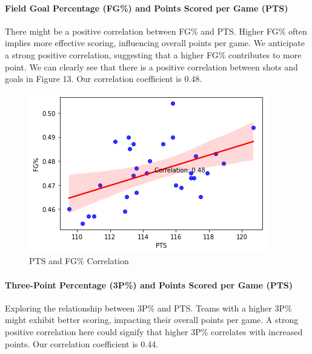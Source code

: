 \documentclass[conference]{IEEEtran}
\begin{document}
\paragraph {Field Goal Percentage (FG\%) and Points Scored per Game (PTS)
}
There might be a positive correlation between FG\% and PTS. Higher FG\% often implies more effective scoring, influencing overall points per game. We anticipate a strong positive correlation, suggesting that a higher FG\% contributes to more point. We can clearly see
that there is a positive correlation between shots and goals in
Figure 13. Our correlation coefficient is 0.48.
\vspace{\baselineskip}\vspace{\baselineskip}
\begin{figure}[h]
    \centering
    \includegraphics[scale=0.6]{pts-fg-cor.png}
    \caption{PTS and FG\% Correlation}
    \label{fig:enter-label}
\end{figure}
\vspace{\baselineskip}

\paragraph {Three-Point Percentage (3P\%) and Points Scored per Game (PTS)
}
Exploring the relationship between 3P\% and PTS. Teams with a higher 3P\% might exhibit better scoring, impacting their overall points per game. A strong positive correlation here could signify that higher 3P\% correlates with increased points. Our correlation coefficient is 0.44.
\vspace{\baselineskip}
\end{document}
